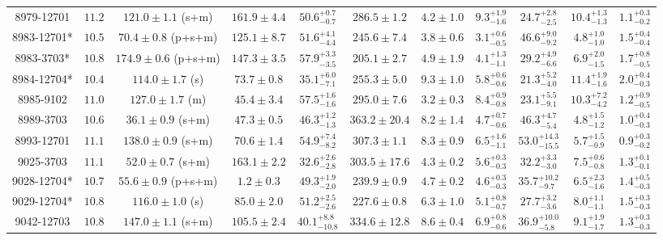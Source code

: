 \begin{landscape}
\begin{longtable}{ccccccccccc}
8979-12701 & $11.2$  & $121.0 \pm 1.1$ (s+m)  & $161.9 \pm 4.4$ & $50.6^{+0.7}_{-0.7}$  & $286.5 \pm 1.2 $ & $4.2 \pm 1.0 $ & $9.3^{+1.9}_{-1.6}$  & $24.7^{+2.8}_{-2.5}$  & $10.4^{+1.3}_{-1.3}$  & $1.1^{+0.3}_{-0.2}$ \\ 
8983-12701* & $10.5$  & $70.4 \pm 0.8$ (p+s+m)  & $125.1 \pm 8.7$ & $51.6^{+4.1}_{-4.4}$  & $245.6 \pm 7.4 $ & $3.8 \pm 0.6 $ & $3.1^{+0.6}_{-0.5}$  & $46.6^{+9.0}_{-9.2}$  & $4.8^{+1.0}_{-1.0}$  & $1.5^{+0.4}_{-0.4}$ \\ 
8983-3703* & $10.8$  & $174.9 \pm 0.6$ (p+s+m)  & $147.3 \pm 3.5$ & $57.9^{+3.3}_{-3.5}$  & $205.1 \pm 2.7 $ & $4.9 \pm 1.9 $ & $4.1^{+1.3}_{-1.1}$  & $29.2^{+4.9}_{-6.6}$  & $6.9^{+2.0}_{-1.5}$  & $1.7^{+0.8}_{-0.5}$ \\ 
8984-12704* & $10.4$  & $114.0 \pm 1.7$ (s)  & $73.7 \pm 0.8$ & $35.1^{+6.0}_{-7.1}$  & $255.3 \pm 5.0 $ & $9.3 \pm 1.0 $ & $5.8^{+0.6}_{-0.6}$  & $21.3^{+5.2}_{-4.0}$  & $11.4^{+1.9}_{-1.6}$  & $2.0^{+0.4}_{-0.3}$ \\ 
8985-9102 & $11.0$  & $127.0 \pm 1.7$ (m)  & $45.4 \pm 3.4$ & $57.5^{+1.6}_{-1.6}$  & $295.0 \pm 7.6 $ & $3.2 \pm 0.3 $ & $8.4^{+0.9}_{-0.8}$  & $23.1^{+5.5}_{-9.1}$  & $10.3^{+7.2}_{-4.2}$  & $1.2^{+0.9}_{-0.5}$ \\ 
8989-3703 & $10.6$  & $36.1 \pm 0.9$ (s+m)  & $47.3 \pm 0.5$ & $46.3^{+1.2}_{-1.3}$  & $363.2 \pm 20.4 $ & $8.2 \pm 1.4 $ & $4.7^{+0.7}_{-0.6}$  & $46.3^{+4.7}_{-5.4}$  & $4.8^{+1.5}_{-1.2}$  & $1.0^{+0.4}_{-0.3}$ \\ 
8993-12701 & $11.1$  & $138.0 \pm 0.9$ (s+m)  & $70.6 \pm 1.4$ & $54.9^{+7.4}_{-8.2}$  & $307.3 \pm 1.1 $ & $8.3 \pm 0.9 $ & $6.5^{+1.6}_{-1.1}$  & $53.0^{+14.3}_{-15.5}$  & $5.7^{+1.5}_{-0.9}$  & $0.9^{+0.3}_{-0.2}$ \\ 
9025-3703 & $11.1$  & $52.0 \pm 0.7$ (s+m)  & $163.1 \pm 2.2$ & $32.6^{+2.6}_{-2.8}$  & $303.5 \pm 17.6 $ & $4.3 \pm 0.2 $ & $5.6^{+0.3}_{-0.3}$  & $32.2^{+3.3}_{-3.0}$  & $7.5^{+0.6}_{-0.8}$  & $1.3^{+0.1}_{-0.1}$ \\ 
9028-12704* & $10.7$  & $55.6 \pm 0.9$ (p+s+m)  & $1.2 \pm 0.3$ & $49.3^{+1.9}_{-2.0}$  & $239.9 \pm 0.9 $ & $4.7 \pm 0.2 $ & $4.6^{+0.3}_{-0.3}$  & $35.7^{+10.2}_{-9.7}$  & $6.5^{+2.3}_{-1.6}$  & $1.4^{+0.5}_{-0.3}$ \\ 
9029-12704* & $10.8$  & $116.0 \pm 1.0$ (s)  & $85.0 \pm 2.0$ & $51.2^{+2.5}_{-2.6}$  & $227.6 \pm 0.8 $ & $6.3 \pm 1.0 $ & $5.1^{+0.8}_{-0.7}$  & $27.7^{+3.2}_{-3.6}$  & $8.0^{+1.1}_{-1.1}$  & $1.5^{+0.3}_{-0.3}$ \\ 
9042-12703 & $10.8$  & $147.0 \pm 1.1$ (s+m)  & $105.5 \pm 2.4$ & $40.1^{+8.8}_{-10.8}$  & $334.6 \pm 12.8 $ & $8.6 \pm 0.4 $ & $6.9^{+0.8}_{-0.6}$  & $36.9^{+10.0}_{-5.8}$  & $9.1^{+1.9}_{-1.7}$  & $1.3^{+0.3}_{-0.3}$ \\ 

\end{longtable}
\end{landscape}
